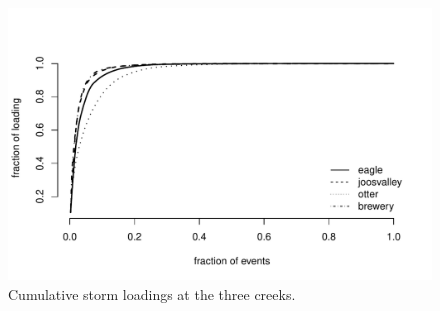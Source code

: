 \documentclass[12pt]{article}
\begin{document}




\begin{figure}
    \begin{center}
\includegraphics{loadings-figure1}
    \end{center}
    \caption{Cumulative storm loadings at the three creeks.\label{cdf}}
\end{figure}
\end{document}
